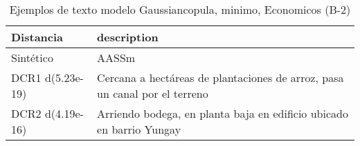 \begin{table}[H]
\centering
\fontsize{10}{14}\selectfont
\caption{Ejemplos de texto modelo Gaussiancopula, minimo, Economicos (B-2)}
\label{table-example-economicos-b-2-gaussiancopula-min-text}
\begin{tabular}{|l|m{35em}|}
\hline
\rowcolor[gray]{0.8}
Distancia & description \\
\hline Sintético & AASSm \\
\hline DCR1 d(5.23e-19) & Cercana a hect\'areas  de plantaciones de arroz, pasa un canal por el terreno \\
\hline DCR2 d(4.19e-16) & Arriendo bodega, en planta baja en edificio ubicado en barrio Yungay \\
\hline
\end{tabular}
\end{table}
